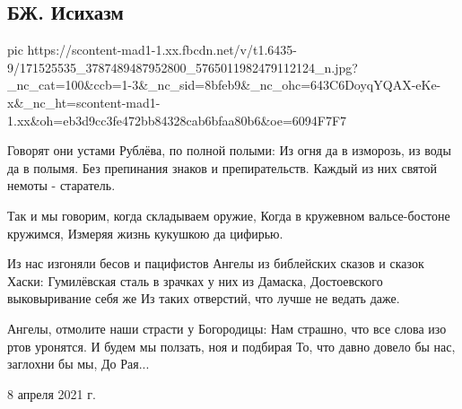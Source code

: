  
 
 
 
 

\subsection{БЖ. Исихазм}
\label{sec:08_04_2021.fb.bilchenko_evgenia.2.isihazm}


\ifcmt
  pic https://scontent-mad1-1.xx.fbcdn.net/v/t1.6435-9/171525535_3787489487952800_5765011982479112124_n.jpg?_nc_cat=100&ccb=1-3&_nc_sid=8bfeb9&_nc_ohc=643C6DoyqYQAX-eKe-x&_nc_ht=scontent-mad1-1.xx&oh=eb3d9cc3fe472bb84328cab6bfaa80b6&oe=6094F7F7
\fi


Говорят они устами Рублёва, по полной полыми:
Из огня да в изморозь, из воды да в полымя.
Без препинания знаков и препирательств.
Каждый из них святой немоты - старатель.

Так и мы говорим, когда складываем оружие,
Когда в кружевном вальсе-бостоне кружимся,
Измеряя жизнь кукушкою да цифирью.

Из нас изгоняли бесов и пацифистов
Ангелы из библейских сказов и сказок Хаски:
Гумилёвская сталь в зрачках у них из Дамаска,
Достоевского выковыривание себя же
Из таких отверстий, что лучше не ведать даже.

Ангелы, отмолите наши страсти у Богородицы:
Нам страшно, что все слова изо ртов уронятся.
И будем мы ползать, ноя и подбирая
То, что давно довело бы нас, заглохни бы мы,
До Рая...

8 апреля 2021 г.

